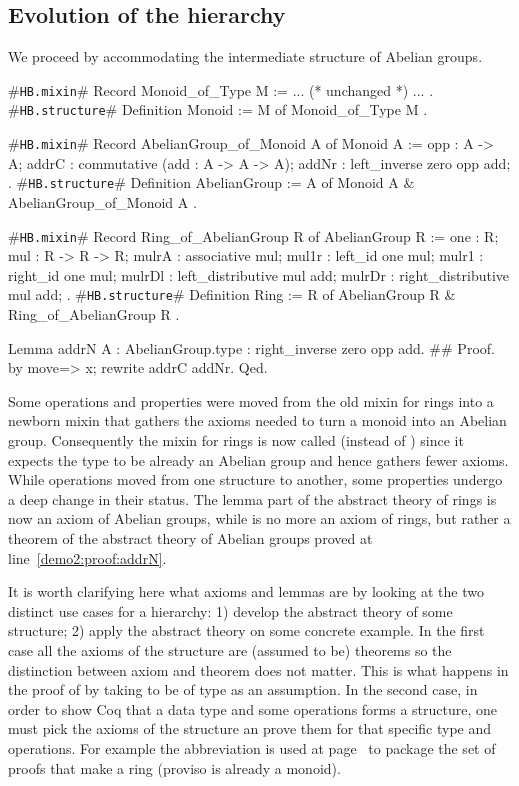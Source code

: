 \documentclass[a4paper,UKenglish,cleveref, autoref]{lipics-v2019}
\newcommand{\mixin}{mixin}
\newcommand{\phantterm}{abbreviation}
\newcommand{\hbmixin}{{\tt\color{dkgreen}HB.mixin}}
\newcommand{\hbstructure}{{\tt\color{dkgreen}HB.structure}}
\theoremstyle{implem}
\theoremstyle{implem}
\theoremstyle{command}
\theoremstyle{commands}
\begin{document}
\subsection{Evolution of the hierarchy}\label{subsec:evolution}

We proceed by accommodating the intermediate
structure of Abelian groups.

\begin{coqcode}
#\hbmixin{}# Record Monoid_of_Type M := { ... (* unchanged *) ... }.
#\hbstructure{}# Definition Monoid := { M of Monoid_of_Type M }.

#\hbmixin{}# Record AbelianGroup_of_Monoid A of Monoid A := {
  opp : A -> A;
  addrC : commutative (add : A -> A -> A);
  addNr : left_inverse zero opp add;
}.
#\hbstructure{}# Definition AbelianGroup := { A of Monoid A & AbelianGroup_of_Monoid A }.

#\hbmixin{}# Record Ring_of_AbelianGroup R of AbelianGroup R := {
  one : R;
  mul : R -> R -> R;
  mulrA : associative mul;
  mul1r : left_id one mul;              mulr1 : right_id one mul;
  mulrDl : left_distributive mul add;   mulrDr : right_distributive mul add;
}.
#\hbstructure{}# Definition Ring := { R of AbelianGroup R & Ring_of_AbelianGroup R }.

Lemma addrN {A : AbelianGroup.type} : right_inverse zero opp add.               #\label{demo2:proof:addrN}#
Proof. by move=> x; rewrite addrC addNr. Qed.
\end{coqcode}

Some operations and properties were moved from the old \mixin{} for rings
into a newborn \mixin{}  that gathers the
axioms needed to turn a monoid into an Abelian group. Consequently the \mixin{}
for rings is now called  (instead of )
since it expects the type  to be already an Abelian group and hence
gathers fewer axioms.
While operations moved from one structure to another, some properties
undergo a deep change in their status.
The lemma  part of the abstract theory of
rings is now an axiom of Abelian groups, while  is no more
an axiom of rings, but rather a theorem of the abstract theory of Abelian
groups proved at line~\ref{demo2:proof:addrN}.

It is worth clarifying here what axioms and lemmas are by looking at the
two distinct use cases for a hierarchy: 1) develop the abstract theory of some
structure; 2) apply the abstract theory on some concrete example.
In the first case
all the axioms of the structure are (assumed to be) theorems so the distinction
between axiom and theorem does not matter. This is what happens
in the proof of  by taking  to be of type
 as an assumption.
In the second case,
in order to show Coq that a data type and some operations forms a structure,
one must pick the axioms of the structure an prove them for that specific
type and operations. For example the  \phantterm{}
is used at page~\pageref{demo:theory:z:ring:axioms} to package the set
of proofs that make  a ring (proviso  is already a monoid).
\end{document}
